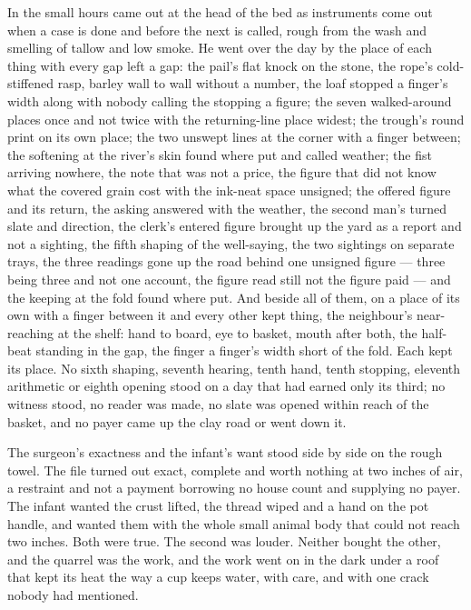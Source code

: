 \scenebreak

In the small hours  came out at the head of the bed as instruments come out when a case is done and before the next is called, rough from the wash and smelling of tallow and low smoke. He went over the day by the place of each thing with every gap left a gap: the pail's flat knock on the stone, the rope's cold-stiffened rasp, barley wall to wall without a number, the loaf stopped a finger's width along with nobody calling the stopping a figure; the seven walked-around places once and not twice with the returning-line place widest; the trough's round print on its own place; the two unswept lines at the corner with a finger between; the softening at the river's skin found where put and called weather; the fist arriving nowhere, the note that was not a price, the figure that did not know what the covered grain cost with the ink-neat space unsigned; the offered figure and its return, the asking answered with the weather, the second man's turned slate and direction, the clerk's entered figure brought up the yard as a report and not a sighting, the fifth shaping of the well-saying, the two sightings on separate trays, the three readings gone up the road behind one unsigned figure --- three being three and not one account, the figure read still not the figure paid --- and the keeping at the fold found where put. And beside all of them, on a place of its own with a finger between it and every other kept thing, the neighbour's near-reaching at the shelf: hand to board, eye to basket, mouth after both, the half-beat standing in the gap, the finger a finger's width short of the fold. Each kept its place. No sixth shaping, seventh hearing, tenth hand, tenth stopping, eleventh arithmetic or eighth opening stood on a day that had earned only its third; no witness stood, no reader was made, no slate was opened within reach of the basket, and no payer came up the clay road or went down it.

The surgeon's exactness and the infant's want stood side by side on the rough towel. The file turned out exact, complete and worth nothing at two inches of air, a restraint and not a payment borrowing no house count and supplying no payer. The infant wanted the crust lifted, the thread wiped and a hand on the pot handle, and wanted them with the whole small animal body that could not reach two inches. Both were true. The second was louder. Neither bought the other, and the quarrel was the work, and the work went on in the dark under a roof that kept its heat the way a cup keeps water, with care, and with one crack nobody had mentioned.

